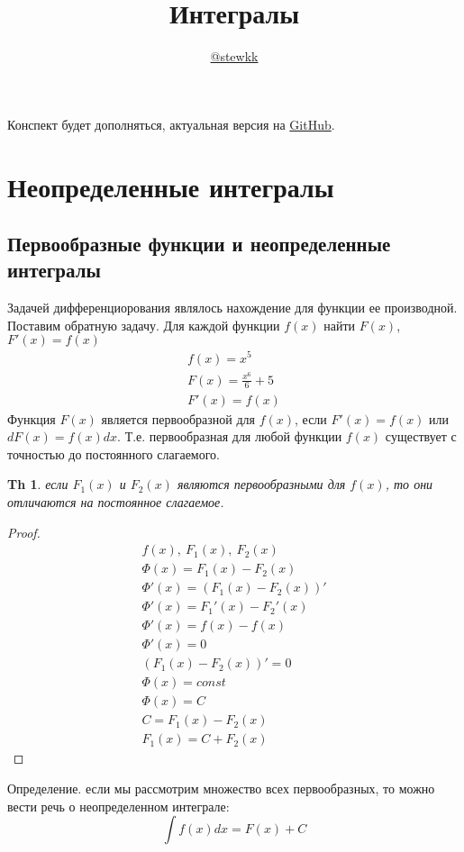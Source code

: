 \documentclass[12pt,a4paper]{article}
\title{Интегралы}
\author{\href{https://t.me/stewkk}{@stewkk}}
\newtheorem{theorem}{Th}
\begin{document}
\maketitle
Конспект будет дополняться, актуальная версия на
\href{https://github.com/stewkk/integrals}{GitHub}.
\section{Неопределенные интегралы}
\subsection{Первообразные функции и неопределенные интегралы}
Задачей дифференциорования являлось нахождение для функции ее производной.
Поставим обратную задачу.
Для каждой функции $f(x)$ найти $F(x)$, $F'(x)=f(x)$
    \begin{gather*}
    f(x) = x^5\\
    F(x) = \frac{x^6}{6} + 5\\
    F'(x) = f(x)
    \end{gather*}
Функция $F(x)$ является первообразной для $f(x)$, если $F'(x)=f(x)$ или $dF(x)=f(x)dx$.
Т.е. первообразная для любой функции $f(x)$ существует с точностью до постоянного слагаемого.

\begin{theorem}
    если $F_1(x)$ и $F_2(x)$ являются первообразными для $f(x)$, то они отличаются на постоянное слагаемое.
\end{theorem}

\begin{proof}
\begin{gather*}
    f(x),\ F_1(x),\ F_2(x) \\
    \Phi(x) = F_1(x) - F_2(x) \\
    \Phi'(x) = (F_1(x) - F_2(x))' \\
    \Phi'(x) = F_1'(x) - F_2'(x) \\
    \Phi'(x) = f(x) - f(x) \\
    \Phi'(x) = 0 \\
    (F_1(x) - F_2(x))' = 0 \\
    \Phi(x) = const \\
    \Phi(x) = C \\
    C = F_1(x) - F_2(x) \\
    F_1(x) = C + F_2(x)
\end{gather*}
\end{proof}

Определение. если мы рассмотрим множество всех первообразных, то можно вести речь о неопределенном интеграле:
\[ \int f(x)dx = F(x) + C \]
\end{document}
